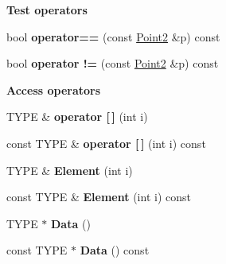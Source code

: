 \begin{Indent}\textbf{ Test operators}\par
\begin{DoxyCompactItemize}
\item 
\mbox{\label{classcy_1_1_point2_a77956893da750b9d17f0078c4bd4acf4}} 
bool {\bfseries operator==} (const \mbox{\hyperlink{classcy_1_1_point2}{Point2}} \&p) const
\item 
\mbox{\label{classcy_1_1_point2_aa18a46f095a4576ff77c7f0bbd173ead}} 
bool {\bfseries operator !=} (const \mbox{\hyperlink{classcy_1_1_point2}{Point2}} \&p) const
\end{DoxyCompactItemize}
\end{Indent}
\begin{Indent}\textbf{ Access operators}\par
\begin{DoxyCompactItemize}
\item 
\mbox{\label{classcy_1_1_point2_aa1022d9f74a4d34571d6587748c64e0f}} 
T\+Y\+PE \& {\bfseries operator \mbox{[}$\,$\mbox{]}} (int i)
\item 
\mbox{\label{classcy_1_1_point2_ab6ef4aec3e3eb9b0ed56cee22b9733c3}} 
const T\+Y\+PE \& {\bfseries operator \mbox{[}$\,$\mbox{]}} (int i) const
\item 
\mbox{\label{classcy_1_1_point2_ae1aa0f136ebf25dae5a41b325add6fde}} 
T\+Y\+PE \& {\bfseries Element} (int i)
\item 
\mbox{\label{classcy_1_1_point2_a758a9fe069fd7e7b7179af033a82efff}} 
const T\+Y\+PE \& {\bfseries Element} (int i) const
\item 
\mbox{\label{classcy_1_1_point2_afe0f1e02c3e75c7314ad91eb80624749}} 
T\+Y\+PE $\ast$ {\bfseries Data} ()
\item 
\mbox{\label{classcy_1_1_point2_ad3778713d428b4e0dd604337b66c8995}} 
const T\+Y\+PE $\ast$ {\bfseries Data} () const
\end{DoxyCompactItemize}
\end{Indent}
